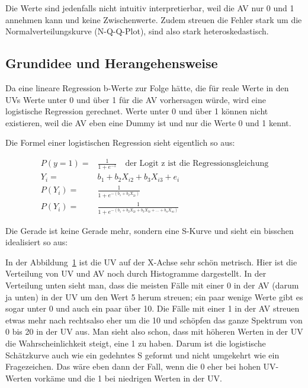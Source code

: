 \documentclass[
  10pt,
  letterpaper,
  a4paper, twoside]{scrreprt}
\begin{document}
Die Werte sind jedenfalls nicht intuitiv interpretierbar, weil die AV
nur 0 und 1 annehmen kann und keine Zwischenwerte. Zudem streuen die
Fehler stark um die Normalverteilungskurve (N-Q-Q-Plot), sind also stark
heteroskedastisch.

\subsection{Grundidee und
Herangehensweise}\label{grundidee-und-herangehensweise}

Da eine lineare Regression b-Werte zur Folge hätte, die für reale Werte
in den UVs Werte unter 0 und über 1 für die AV vorhersagen würde, wird
eine logistische Regression gerechnet. Werte unter 0 und über 1 können
nicht existieren, weil die AV eben eine Dummy ist und nur die Werte 0
und 1 kennt.

Die Formel einer logistischen Regression sieht eigentlich so aus:

\begin{align}
    P(y = 1)  = & \frac{1}{1+e^{-z}} \quad \text{der Logit z ist die Regressionsgleichung}\\
    Y_i= & b_1 + b_2X_{i2} + b_3X_{i3}+e_i\\
    P(Y_i) = & \frac{1}{1+e^{-(b_1+b_2X_{2i})}}\\
    P(Y_i) = & \frac{1}{1+e^{-(b_1+b_2X_{2i}+b_3X_{3i} + \dots +  b_nX_{ni})}}
\end{align}

Die Gerade ist keine Gerade mehr, sondern eine S-Kurve und sieht ein
bisschen idealisiert so aus:

\begin{figure}


\caption{\label{fig-LogRegSimulation}}

\end{figure}%

In der Abbildung~\ref{fig-LogRegSimulation} ist die UV auf der X-Achse
sehr schön metrisch. Hier ist die Verteilung von UV und AV noch durch
Histogramme dargestellt. In der Verteilung unten sieht man, dass die
meisten Fälle mit einer 0 in der AV (darum ja unten) in der UV um den
Wert 5 herum streuen; ein paar wenige Werte gibt es sogar unter 0 und
auch ein paar über 10. Die Fälle mit einer 1 in der AV streuen etwas
mehr nach rechtsalso eher um die 10 und schöpfen das ganze Spektrum von
0 bis 20 in der UV aus. Man sieht also schon, dass mit höheren Werten in
der UV die Wahrscheinlichkeit steigt, eine 1 zu haben. Darum ist die
logistische Schätzkurve auch wie ein gedehntes S geformt und nicht
umgekehrt wie ein Fragezeichen. Das wäre eben dann der Fall, wenn die 0
eher bei hohen UV-Werten vorkäme und die 1 bei niedrigen Werten in der
UV.
\end{document}
